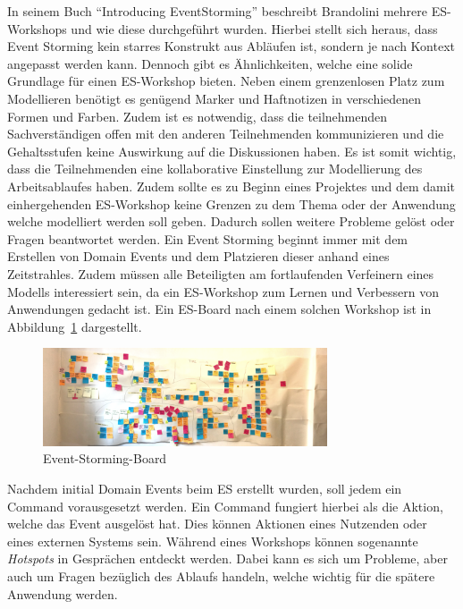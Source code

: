 In seinem Buch ``Introducing EventStorming'' beschreibt Brandolini mehrere \ac{ES}-Workshops und wie diese durchgeführt wurden\cite*{introES}.
Hierbei stellt sich heraus, dass Event Storming kein starres Konstrukt aus Abläufen ist, sondern je nach Kontext angepasst werden kann.
Dennoch gibt es Ähnlichkeiten, welche eine solide Grundlage für einen \ac{ES}-Workshop bieten\cite*{introES}.
Neben einem grenzenlosen Platz zum Modellieren benötigt es genügend Marker und Haftnotizen in verschiedenen Formen und Farben.
Zudem ist es notwendig, dass die teilnehmenden Sachverständigen offen mit den anderen Teilnehmenden kommunizieren und die Gehaltsstufen keine Auswirkung
auf die Diskussionen haben.
Es ist somit wichtig, dass die Teilnehmenden eine kollaborative Einstellung zur Modellierung des Arbeitsablaufes haben.
Zudem sollte es zu Beginn eines Projektes und dem damit einhergehenden \ac{ES}-Workshop keine Grenzen zu dem Thema oder der Anwendung welche modelliert werden soll geben.
Dadurch sollen weitere Probleme gelöst oder Fragen beantwortet werden.
Ein Event Storming beginnt immer mit dem Erstellen von Domain Events und dem Platzieren dieser anhand eines Zeitstrahles.
Zudem müssen alle Beteiligten am fortlaufenden Verfeinern eines Modells interessiert sein, da ein \ac{ES}-Workshop zum Lernen und Verbessern
von Anwendungen gedacht ist.
Ein \ac{ES}-Board nach einem solchen Workshop ist in Abbildung~\ref{fig:rlBoard} dargestellt\cite*{esBoard}.

\begin{figure}[!h]
    \centering
    \includegraphics[width=0.75\textwidth]{images/2.1/event-storming}
    \caption{Event-Storming-Board}
    \label{fig:rlBoard}
\end{figure}

Nachdem initial Domain Events beim \ac{ES} erstellt wurden, soll jedem ein Command vorausgesetzt werden.
Ein Command fungiert hierbei als die Aktion, welche das Event ausgelöst hat.
Dies können Aktionen eines Nutzenden oder eines externen Systems sein.
Während eines Workshops können sogenannte \textit{Hotspots} in Gesprächen entdeckt werden.
Dabei kann es sich um Probleme, aber auch um Fragen bezüglich des Ablaufs handeln, welche wichtig für die spätere Anwendung werden.

